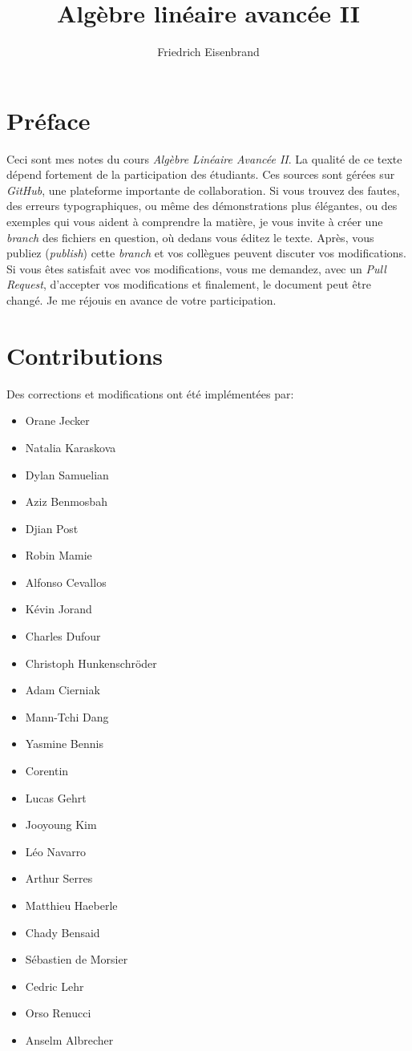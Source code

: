 \documentclass[a4paper,11pt,french]{scrbook}
\title{Algèbre linéaire avancée II}
\author{Friedrich Eisenbrand}
\theoremstyle{plain}
\theoremstyle{definition}
\begin{document}
\maketitle
  
\section*{Préface}
\noindent Ceci sont mes notes du cours \emph{Algèbre Linéaire Avancée II}.
La qualité de ce texte dépend fortement de la participation  des étudiants. 
Ces  sources sont gérées sur \emph{GitHub}, une plateforme importante de collaboration. Si vous trouvez des fautes, des erreurs typographiques, ou même des démonstrations plus élégantes, ou des exemples qui vous aident à comprendre la matière, je vous invite à créer une \emph{branch} des fichiers en question, où dedans vous éditez le texte. Après, vous publiez (\emph{publish}) cette \emph{branch} et vos collègues peuvent discuter vos modifications. Si vous êtes satisfait avec vos modifications, vous me demandez, avec un \emph{Pull Request}, d'accepter vos modifications et finalement, le document peut être changé. Je me réjouis en avance de votre participation. 

  
\section*{Contributions}

Des corrections et modifications ont été implémentées par: 
\begin{itemize}
\item Orane Jecker 
\item Natalia Karaskova
\item Dylan Samuelian
\item Aziz Benmosbah
\item Djian Post
\item Robin Mamie
\item Alfonso Cevallos
\item Kévin Jorand
\item Charles Dufour 
\item Christoph Hunkenschröder
\item Adam Cierniak
\item Mann-Tchi Dang
\item Yasmine Bennis
\item Corentin 
\item Lucas Gehrt
\item Jooyoung Kim 
\item Léo Navarro
\item Arthur Serres
\item Matthieu Haeberle
\item Chady Bensaid
\item Sébastien de Morsier 
\item Cedric Lehr
\item Orso Renucci
\item Anselm Albrecher
\end{itemize}
\end{document}
